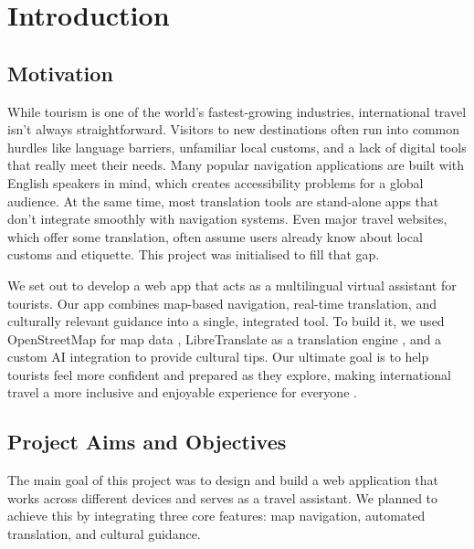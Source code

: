 \chapter{Introduction}

\section{Motivation}

While tourism is one of the world's fastest-growing industries, international travel isn't always straightforward. Visitors to new destinations often run into common hurdles like language barriers, unfamiliar local customs, and a lack of digital tools that really meet their needs. Many popular navigation applications are built with English speakers in mind, which creates accessibility problems for a global audience. At the same time, most translation tools are stand-alone apps that don't integrate smoothly with navigation systems. Even major travel websites, which offer some translation, often assume users already know about local customs and etiquette. This project was initialised to fill that gap.

We set out to develop a web app that acts as a multilingual virtual assistant for tourists. Our app combines map-based navigation, real-time translation, and culturally relevant guidance into a single, integrated tool. To build it, we used OpenStreetMap for map data \cite{osm}, LibreTranslate as a translation engine \cite{libretranslate}, and a custom AI integration to provide cultural tips. Our ultimate goal is to help tourists feel more confident and prepared as they explore, making international travel a more inclusive and enjoyable experience for everyone \cite{inclusiveTourism}.

\section{Project Aims and Objectives}

The main goal of this project was to design and build a web application that works across different devices and serves as a travel assistant. We planned to achieve this by integrating three core features: map navigation, automated translation, and cultural guidance.

